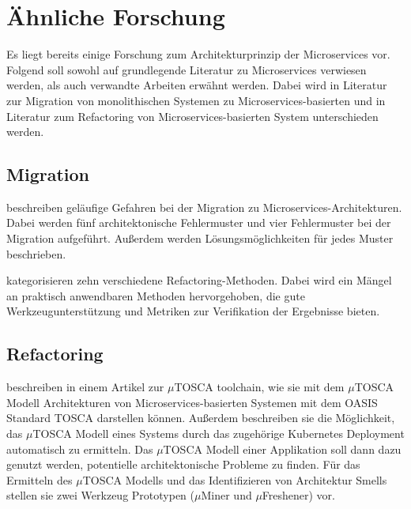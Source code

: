 \chapter{Ähnliche Forschung}
\label{chap:aehnliche-forschung}

Es liegt bereits einige Forschung zum Architekturprinzip der Microservices vor.
Folgend soll sowohl auf grundlegende Literatur zu Microservices verwiesen werden, als auch verwandte Arbeiten erwähnt werden.
Dabei wird in Literatur zur Migration von monolithischen Systemen zu Microservices-basierten und in Literatur zum Refactoring von Microservices-basierten System unterschieden werden.

\section{Migration}

 beschreiben geläufige Gefahren bei der Migration zu Microservices-Architekturen.
Dabei  werden fünf architektonische Fehlermuster und vier Fehlermuster bei der Migration aufgeführt.
Außerdem werden Lösungsmöglichkeiten für jedes Muster beschrieben.

 kategorisieren zehn verschiedene Refactoring-Methoden.
Dabei wird ein Mängel an praktisch anwendbaren Methoden hervorgehoben, die gute Werkzeugunterstützung und Metriken zur Verifikation der Ergebnisse bieten.

\section{Refactoring}

 beschreiben in einem Artikel zur $\mu$TOSCA toolchain, wie sie mit dem  $\mu$TOSCA Modell Architekturen von Microservices-basierten Systemen mit dem OASIS Standard TOSCA darstellen können.
Außerdem beschreiben sie die Möglichkeit, das $\mu$TOSCA Modell eines Systems durch das zugehörige Kubernetes Deployment automatisch zu ermitteln.
Das $\mu$TOSCA Modell einer Applikation soll dann dazu genutzt werden, potentielle architektonische Probleme zu finden.
Für das Ermitteln des $\mu$TOSCA Modells und das Identifizieren von Architektur Smells stellen sie zwei Werkzeug Prototypen ($\mu$Miner und $\mu$Freshener) vor.
